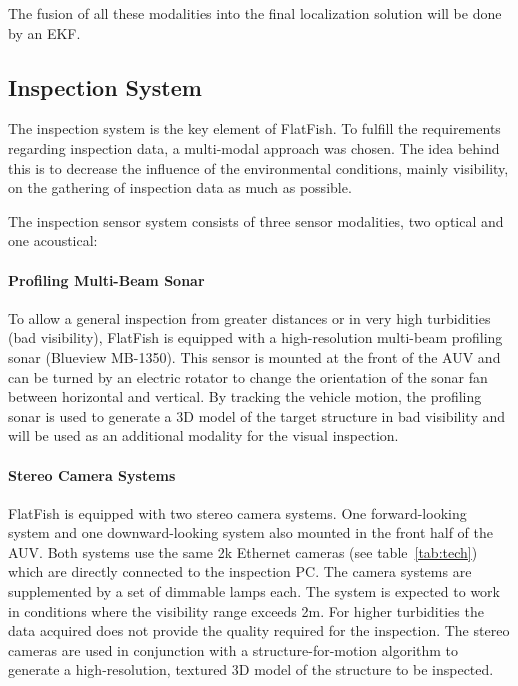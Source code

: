 \documentclass[conference]{IEEEtran}
\begin{document}
The fusion of all these modalities into the final localization solution will be done by an EKF.

\subsection{Inspection System}
\label{sec:insp}

The inspection system is the key element of FlatFish. To fulfill the requirements 
regarding inspection data, a multi-modal approach was chosen. The idea behind this is 
to decrease the influence of the environmental conditions, mainly visibility, on the gathering 
of inspection data as much as possible.

The inspection sensor system consists of three sensor modalities, two optical and one 
acoustical:
\paragraph*{\textbf{Profiling Multi-Beam Sonar}} To allow a general inspection from greater 
distances or in very high turbidities (bad visibility), FlatFish is equipped with a high-resolution 
multi-beam profiling sonar (Blueview MB-1350). This sensor is mounted at the front of the AUV 
and can be turned by an electric rotator to change the orientation of the sonar fan between 
horizontal and vertical. By tracking the vehicle motion, the profiling sonar is used to generate 
a 3D model of the target structure in bad visibility and will be used as an 
additional modality for the visual inspection.

\paragraph*{\textbf{Stereo Camera Systems}} FlatFish is equipped with two stereo camera systems. 
One forward-looking system and one downward-looking system 
 also mounted in the front half of the AUV. Both systems use the same 2k Ethernet cameras 
(see table~\ref{tab:tech}) which are directly connected to the inspection PC. The 
camera systems are supplemented by a set of dimmable lamps each. The system is expected 
to work in conditions where the visibility range exceeds 2m. For higher turbidities the data acquired does not provide the 
quality required for the inspection. The stereo cameras are used in conjunction with a 
structure-for-motion algorithm to generate a high-resolution, textured 3D model of the 
structure to be inspected.
\end{document}

